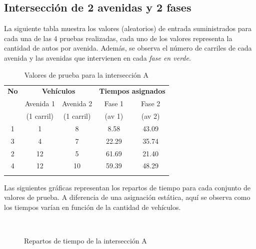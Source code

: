 \newpage
\subsection{Intersección de 2 avenidas y 2 fases}
La siguiente tabla muestra los valores (aleatorios) de entrada suministrados para cada una de las 4 pruebas realizadas, cada uno de los valores representa la cantidad de autos por avenida. Además, se observa el número de carriles de cada avenida y las avenidas que intervienen en cada \emph{fase en verde}.

\begin{longtable}[c]{ccccc} \toprule
	\textbf{No} &\multicolumn{2}{c}{\textbf{Vehículos}} & \multicolumn{2}{c}{\textbf{Tiempos asignados}} \\[0.2cm]
	&  Avenida 1 & Avenida 2 & Fase 1 & Fase 2 \\[0cm]
	&{\scriptsize(1 carril)}&{\scriptsize (1 carril)} &{\scriptsize (av 1)} &{\scriptsize(av 2)} \\[0.1cm]\midrule
	1 & 1 & 8 & 8.58 &43.09\\
	3 & 4 & 7 & 22.29 & 35.74\\
	2 & 12 & 5 & 61.69 & 21.40\\
	4 & 12 & 10 & 59.39 & 48.29\\\bottomrule
	\caption{Valores de prueba para la intersección A}
\end{longtable}

Las siguientes gráficas representan los repartos de tiempo para cada conjunto de valores de prueba. A diferencia de una asignación estática, aquí se observa como los tiempos varían en función de la cantidad de vehículos.

\begin{figure}[H]
	\centering
	\\
	\caption{Repartos de tiempo de la intersección A}
\end{figure}





